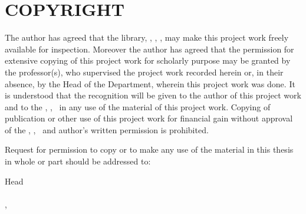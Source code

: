 \section*{COPYRIGHT \textcopyright}

The author has agreed that the library, \thedepartment, \theinstitute, \thecampus, may make this project
work freely available for inspection. Moreover the author has agreed that the
permission for extensive copying of this project work for scholarly purpose may be
granted by the professor(s), who supervised the project work recorded herein or, in
their absence, by the Head of the Department, wherein this project work was done. It
is understood that the recognition will be given to the author of this project work and
to the \thedepartment, \theinstitute, \thecampus \ in any use of the material of this project work. Copying of publication or other use of
this project work for financial gain without approval of the \thedepartment, \theinstitute, \thecampus \ and author’s
written permission is prohibited.

\noindent Request for permission to copy or to make any use of the material in this thesis in
whole or part should be addressed to:

\vspace{1cm}

\noindent Head\\
\thedepartment\\
\theinstitute, \thecampus\\
\thedepartmentFullAddress
